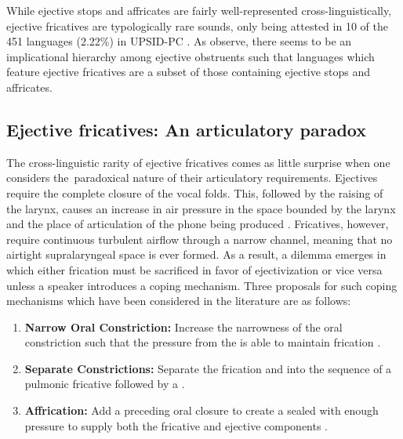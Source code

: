 \documentclass[output=paper
,newtxmath
,modfonts
,nonflat]{langsci/langscibook}
\begin{document}

While ejective stops and affricates are fairly well-represented cross-linguistically, ejective fricatives are typologically rare sounds, only being attested in 10 of the 451 languages (2.22\%) in UPSID-PC \citep{maddieson1990updating}. As \citet{shosted2011affricating} observe, there seems to be an implicational hierarchy among ejective obstruents such that languages which feature ejective fricatives are a subset of those containing ejective stops and affricates.

\subsection{Ejective fricatives: An articulatory paradox}\label{sec:moeng:2.2}

The cross-linguistic rarity of ejective fricatives comes as little surprise when one considers the~paradoxical nature of their articulatory requirements. Ejectives require the complete closure of the vocal folds. This, followed by the raising of the larynx, causes an increase in air pressure in the space bounded by the larynx and the place of articulation of the phone being produced \citep[130]{Ladefoged1993}. Fricatives, however, require continuous turbulent airflow through a narrow channel, meaning that no airtight supralaryngeal space is ever formed. As a result, a dilemma emerges in which either frication must be sacrificed in favor of ejectivization or vice versa unless a speaker introduces a coping mechanism. Three proposals for such coping mechanisms which have been considered in the literature are as follows:

\begin{enumerate}
	\item \textbf{Narrow Oral Constriction:} Increase the narrowness of the oral constriction such that the pressure from the  is able to maintain frication \citep{maddieson1997,maddieson1998make}.
\item \textbf{Separate Constrictions:} Separate the frication and  into the sequence of a pulmonic fricative followed by a  \citep{maddieson1997,maddieson1998make}.
\item \textbf{Affrication:} Add a preceding oral closure to create a sealed  with enough pressure to supply both the fricative and ejective components \citep{shosted2011affricating}.
\end{enumerate}
\end{document}
